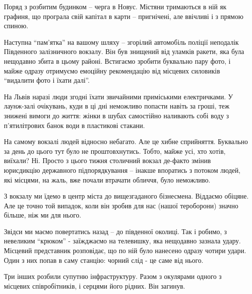 

Поряд з розбитим будинком – черга в Новус. Містяни тримаються в ній як графиня,
що програла свій капітал в карти – пригнічені, але ввічливі і з прямою спиною.

Наступна \enquote{пам'ятка} на вашому шляху – згорілий автомобіль поліції неподалік
Південного залізничного вокзалу. Він був знищений від уламків ракети, яка була
нещодавно збита в цьому районі. Встигаємо зробити буквально пару фото, і майже
одразу отримуємо емоційну рекомендацію від місцевих силовиків \enquote{видалити фото і
їхати далі}.


На Львів наразі люди згодні їхати звичайними приміськими електричками. У
лаунж-залі очікувань, куди в ці дні неможливо попасти навіть за гроші, теж
знижені вимоги до життя: жінки в шубах самостійно наливають собі воду з
п’ятилітрових банок води в пластикові стакани.

На самому вокзалі людей відносно небагато. Але це хибне сприйняття. Буквально
за день до цього тут було не проштовхнутись. Тобто, майже усі, хто хотів,
виїхали? Ні. Просто з цього тижня столичний вокзал де-факто змінив юрисдикцію
державного підпорядкування – інакше впоратись з потоком людей, які місцями, на
жаль, вже почали втрачати обличчя, було неможливо.


З вокзалу ми їдемо в центр міста до вищезгаданого бізнесмена. Віддаємо обіцяне.
Але це точно той випадок, коли він зробив для нас (нашої тероборони) значно
більше, ніж ми для нього. 


Звідси ми маємо повертатись назад – до південної околиці. Так і робимо, з
невеликим \enquote{крюком} - заїжджаємо на телевишку, яка нещодавно зазнала удару.
Місцевий представник розповідає, що по ній було нанесено одразу чотири удари.
Один з них попав в саму станцію: чорний слід  - це саме від нього. 

Три інших розбили супутню інфраструктуру. Разом з окулярами одного з місцевих
співробітників, і серцями його рідних. Він загинув.



